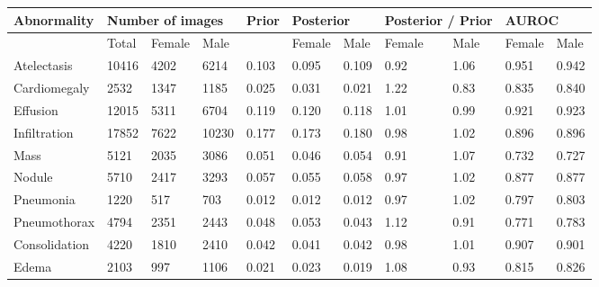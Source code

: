 \documentclass[12pt,oneside,a4paper]{report}
\begin{document}
\begin{landscape}
\begin{table}
\centering
\begin{tabular}{@{}lllllllllll@{}}
\toprule
\textbf{Abnormality}        & \multicolumn{3}{l}{\textbf{Number of images}} &  \textbf{Prior} & \multicolumn{2}{l}{\textbf{Posterior}} & \multicolumn{2}{l}{\textbf{Posterior / Prior}} & \multicolumn{2}{l}{\textbf{AUROC}}       \\ \midrule
                   & Total            & Female & Male  &                   & Female                & Male  & Female            & Male & Female & Male  \\ \midrule
Atelectasis        & 10416            & 4202   & 6214  & 0.103             & 0.095                 & 0.109 & 0.92              & 1.06 & 0.951  & 0.942 \\ \midrule
Cardiomegaly       & 2532             & 1347   & 1185  & 0.025             & 0.031                 & 0.021 & 1.22              & 0.83 & 0.835  & 0.840 \\ \midrule
Effusion           & 12015            & 5311   & 6704  & 0.119             & 0.120                 & 0.118 & 1.01              & 0.99 & 0.921  & 0.923 \\ \midrule
Infiltration       & 17852            & 7622   & 10230 & 0.177             & 0.173                 & 0.180 & 0.98              & 1.02 & 0.896  & 0.896 \\ \midrule
Mass               & 5121             & 2035   & 3086  & 0.051             & 0.046                 & 0.054 & 0.91              & 1.07 & 0.732  & 0.727 \\ \midrule
Nodule             & 5710             & 2417   & 3293  & 0.057             & 0.055                 & 0.058 & 0.97              & 1.02 & 0.877  & 0.877 \\ \midrule
Pneumonia          & 1220             & 517    & 703   & 0.012             & 0.012                 & 0.012 & 0.97              & 1.02 & 0.797  & 0.803 \\ \midrule
Pneumothorax       & 4794             & 2351   & 2443  & 0.048             & 0.053                 & 0.043 & 1.12              & 0.91 & 0.771  & 0.783 \\ \midrule
Consolidation      & 4220             & 1810   & 2410  & 0.042             & 0.041                 & 0.042 & 0.98              & 1.01 & 0.907  & 0.901 \\ \midrule
Edema              & 2103             & 997    & 1106  & 0.021             & 0.023                 & 0.019 & 1.08              & 0.93 & 0.815  & 0.826 \\ \midrule

\end{tabular}
\end{table}
\end{landscape}
\end{document}
